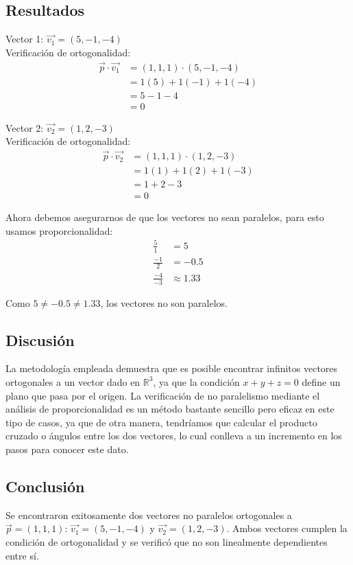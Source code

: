 \documentclass{article}
\begin{document}
\subsection{Resultados}
\setcounter{equation}{0}

Vector 1: $\vec{v_1} = (5,-1,-4)$ \\
Verificación de ortogonalidad: \\
\begin{align}
\vec{p} \cdot \vec{v_1} &= (1, 1, 1) \cdot (5, -1, -4) \\
&= 1(5) + 1(-1) + 1(-4) \\
&= 5 - 1 - 4 \\
&= 0
\end{align}

Vector 2: $\vec{v_2} = (1, 2, -3)$ \\
Verificación de ortogonalidad: \\
\begin{align}
\vec{p} \cdot \vec{v_2} &= (1, 1, 1) \cdot (1, 2, -3) \\
&= 1(1) + 1(2) + 1(-3) \\
&= 1 + 2 - 3 \\
&= 0
\end{align}

Ahora debemos asegurarnos de que los vectores no sean paralelos, para esto usamos proporcionalidad:
\begin{align}
\frac{5}{1} &= 5 \\
\frac{-1}{2} &= -0.5 \\
\frac{-4}{-3} &\approx 1.33
\end{align}

Como $5 \neq -0.5 \neq 1.33$, los vectores no son paralelos.

\subsection{Discusión}
La metodología empleada demuestra que es posible encontrar infinitos vectores ortogonales a un vector dado en $\mathbb{R}^3$, ya que la condición $x + y + z = 0$ define un plano que pasa por el origen. La verificación de no paralelismo mediante el análisis de proporcionalidad es un método bastante sencillo pero eficaz en este tipo de casos, ya que de otra manera, tendríamos que calcular el producto cruzado o ángulos entre los dos vectores, lo cual conlleva a un incremento en los pasos para conocer este dato.

\subsection{Conclusión}
Se encontraron exitosamente dos vectores no paralelos ortogonales a $\vec{p} = (1, 1, 1)$: $\vec{v_1} = (5, -1, -4)$ y $\vec{v_2} = (1, 2, -3)$. Ambos vectores cumplen la condición de ortogonalidad y se verificó que no son linealmente dependientes entre sí.
\end{document}
